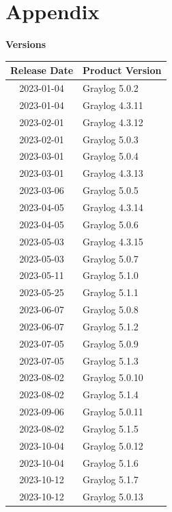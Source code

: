 \documentclass[../main.tex]{subfiles}
\begin{document}
\chapter{Appendix}

\textbf{Versions}

\begin{table}[h]
\centering
\begin{minipage}{0.45\textwidth}
\centering
\begin{tabular}{|c|l|}
\hline
\textbf{Release Date} & \textbf{Product Version} \\ \hline
    2023-01-04 & Graylog 5.0.2 \\ \hline
    2023-01-04 & Graylog 4.3.11 \\ \hline  
    2023-02-01 & Graylog 4.3.12 \\ \hline  
    2023-02-01 & Graylog 5.0.3 \\ \hline  
    2023-03-01 & Graylog 5.0.4 \\ \hline  
    2023-03-01 & Graylog 4.3.13 \\ \hline  
    2023-03-06 & Graylog 5.0.5 \\ \hline  
    2023-04-05 & Graylog 4.3.14 \\ \hline  
    2023-04-05 & Graylog 5.0.6 \\ \hline  
    2023-05-03 & Graylog 4.3.15 \\ \hline  
    2023-05-03 & Graylog 5.0.7 \\ \hline  
    2023-05-11 & Graylog 5.1.0 \\ \hline  
    2023-05-25 & Graylog 5.1.1 \\ \hline  
    2023-06-07 & Graylog 5.0.8 \\ \hline  
    2023-06-07 & Graylog 5.1.2 \\ \hline  
    2023-07-05 & Graylog 5.0.9 \\ \hline  
    2023-07-05 & Graylog 5.1.3 \\ \hline  
    2023-08-02 & Graylog 5.0.10 \\ \hline  
    2023-08-02 & Graylog 5.1.4 \\ \hline  
    2023-09-06 & Graylog 5.0.11 \\ \hline  
    2023-08-02 & Graylog 5.1.5 \\ \hline  
    2023-10-04 & Graylog 5.0.12 \\ \hline  
    2023-10-04 & Graylog 5.1.6 \\ \hline  
    2023-10-12 & Graylog 5.1.7 \\ \hline  
    2023-10-12 & Graylog 5.0.13 \\ \hline  

\end{tabular}
\end{minipage}
\end{table}
\end{document}
